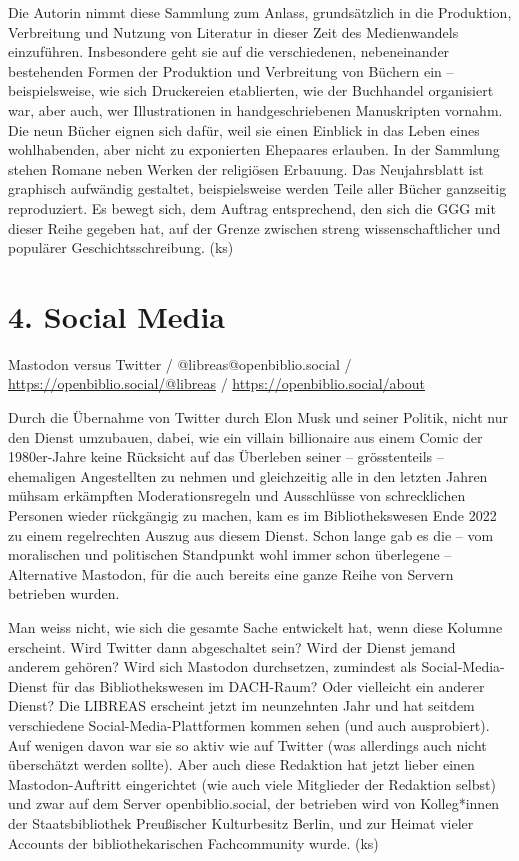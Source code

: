 \documentclass[a4paper,
fontsize=11pt,
oneside,
numbers=noperiodatend,
parskip=half-,
bibliography=totoc,
final
]{scrartcl}
\begin{document}
Die Autorin nimmt diese Sammlung zum Anlass, grundsätzlich in die
Produktion, Verbreitung und Nutzung von Literatur in dieser Zeit des
Medienwandels einzuführen. Insbesondere geht sie auf die verschiedenen,
nebeneinander bestehenden Formen der Produktion und Verbreitung von
Büchern ein -- beispielsweise, wie sich Druckereien etablierten, wie der
Buchhandel organisiert war, aber auch, wer Illustrationen in
handgeschriebenen Manuskripten vornahm. Die neun Bücher eignen sich
dafür, weil sie einen Einblick in das Leben eines wohlhabenden, aber
nicht zu exponierten Ehepaares erlauben. In der Sammlung stehen Romane
neben Werken der religiösen Erbauung. Das Neujahrsblatt ist graphisch
aufwändig gestaltet, beispielsweise werden Teile aller Bücher ganzseitig
reproduziert. Es bewegt sich, dem Auftrag entsprechend, den sich die GGG
mit dieser Reihe gegeben hat, auf der Grenze zwischen streng
wissenschaftlicher und populärer Geschichtsschreibung. (ks)

\hypertarget{social-media}{%
\section{4. Social Media}\label{social-media}}

Mastodon versus Twitter / @libreas@openbiblio.social /
\href{https://openbiblio.social/@libreas}{https://openbiblio.social/@libreas}
/ \url{https://openbiblio.social/about}

Durch die Übernahme von Twitter durch Elon Musk und seiner Politik,
nicht nur den Dienst umzubauen, dabei, wie ein villain billionaire aus
einem Comic der 1980er-Jahre keine Rücksicht auf das Überleben seiner --
grösstenteils -- ehemaligen Angestellten zu nehmen und gleichzeitig alle
in den letzten Jahren mühsam erkämpften Moderationsregeln und
Ausschlüsse von schrecklichen Personen wieder rückgängig zu machen, kam
es im Bibliothekswesen Ende 2022 zu einem regelrechten Auszug aus diesem
Dienst. Schon lange gab es die -- vom moralischen und politischen
Standpunkt wohl immer schon überlegene -- Alternative Mastodon, für die
auch bereits eine ganze Reihe von Servern betrieben wurden.

Man weiss nicht, wie sich die gesamte Sache entwickelt hat, wenn diese
Kolumne erscheint. Wird Twitter dann abgeschaltet sein? Wird der Dienst
jemand anderem gehören? Wird sich Mastodon durchsetzen, zumindest als
Social-Media-Dienst für das Bibliothekswesen im DACH-Raum? Oder
vielleicht ein anderer Dienst? Die LIBREAS erscheint jetzt im
neunzehnten Jahr und hat seitdem verschiedene Social-Media-Plattformen
kommen sehen (und auch ausprobiert). Auf wenigen davon war sie so aktiv
wie auf Twitter (was allerdings auch nicht überschätzt werden sollte).
Aber auch diese Redaktion hat jetzt lieber einen Mastodon-Auftritt
eingerichtet (wie auch viele Mitglieder der Redaktion selbst) und zwar
auf dem Server openbiblio.social, der betrieben wird von Kolleg*innen
der Staatsbibliothek Preußischer Kulturbesitz Berlin, und zur Heimat
vieler Accounts der bibliothekarischen Fachcommunity wurde. (ks)
\end{document}
